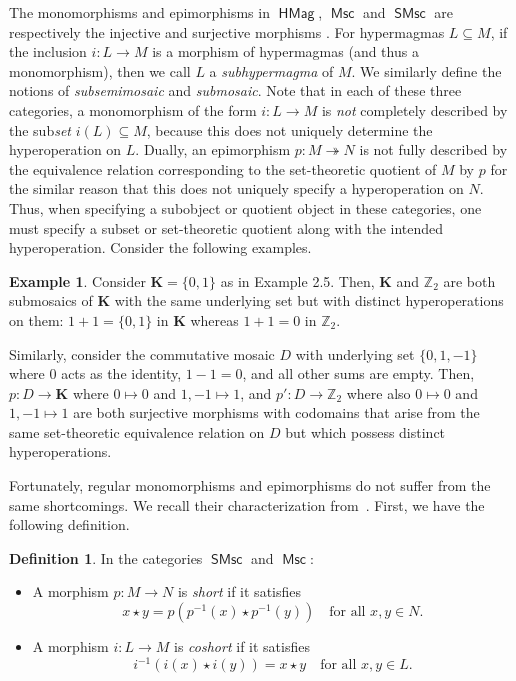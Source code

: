 \documentclass[reqno]{amsart}
\newcommand{\cat}[1]{\ensuremath{\mathsf{#1}}}
\DeclareMathOperator{\HMag}{\cat{HMag}}
\DeclareMathOperator{\Msc}{\cat{Msc}}
\DeclareMathOperator{\SMsc}{\cat{SMsc}}
\newcommand{\Z}{\mathbb{Z}}
\newcommand{\K}{\mathbf{K}}
\numberwithin{equation}{section}
\theoremstyle{plain}
\theoremstyle{definition}
\newtheorem{definition}[equation]{Definition}
\newtheorem{example}[equation]{Example}
\begin{document}
The monomorphisms and epimorphisms in $\HMag$, $\Msc$ and $\SMsc$ are respectively the injective and surjective morphisms \cite{NakamuraReyes}. For hypermagmas $L\subseteq M$, if the inclusion $i:L\to M$ is a morphism of hypermagmas (and thus a monomorphism), then we call $L$ a \textit{subhypermagma} of $M$. We similarly define the notions of \textit{subsemimosaic} and \textit{submosaic}. Note that in each of these three categories, a monomorphism of the form $i \colon L \to M$ is \emph{not} completely described by the sub\textit{set} $i(L) \subseteq M$, because this does not uniquely determine the hyperoperation on $L$. Dually, an epimorphism $p \colon M \twoheadrightarrow N$ is not fully described by the equivalence relation corresponding to the set-theoretic quotient of $M$ by $p$ for the similar reason that this does not uniquely specify a hyperoperation on $N$. Thus, when specifying a subobject or quotient object in these categories, one must specify a subset or set-theoretic quotient along with the intended hyperoperation. Consider the following examples.

\begin{example}
Consider $\K =\{0, 1\}$ as in Example 2.5. Then, $\K$ and $\Z_2$ are both submosaics of $\K$ with the same underlying set but with distinct hyperoperations on them: $1+1=\{0, 1\}$ in $\K$ whereas $1+1=0$ in $\Z_2$. 

Similarly, consider the commutative mosaic $D$ with underlying set $\{0, 1, -1\}$ where $0$ acts as the identity, $1-1=0$, and all other sums are empty. Then, $p:D\to \K$ where $0\mapsto 0$ and $1, -1\mapsto 1$, and $p':D\to \Z_2$ where also $0\mapsto 0$ and $1, -1\mapsto 1$ are both surjective morphisms with codomains that arise from the same set-theoretic equivalence relation on $D$ but which possess distinct hyperoperations.
\end{example}


Fortunately, regular monomorphisms and epimorphisms do not suffer from the same shortcomings. We recall their characterization from~\cite[Theorem 1.2]{NakamuraReyes}. First, we have the following definition.

\begin{definition} In the categories $\SMsc$ and $\Msc$:
\begin{itemize}
    \item A morphism $p \colon M \to N$ is \emph{short} if it satisfies
 \[
 x \star y = p(p^{-1}(x) \star p^{-1}(y)) \quad \mbox{for all } x,y \in N.
 \]
    \item A morphism $i \colon L \to M$ is \emph{coshort} if it satisfies
 \[
 i^{-1}(i(x) \star i(y)) = x \star y \quad \mbox{for all } x,y \in L.
 \]
\end{itemize}
    
\end{definition}
\end{document}
